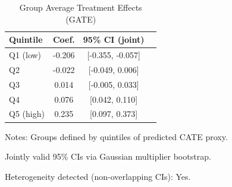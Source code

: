 \begin{table}[h]
\centering
\caption{Group Average Treatment Effects (GATE)}
\begin{tabular}{lccc}
\toprule
Quintile & Coef. & 95\% CI (joint) \\
\midrule
Q1 (low) & -0.206 & [-0.355, -0.057] \\
Q2 & -0.022 & [-0.049, 0.006] \\
Q3 & 0.014 & [-0.005, 0.033] \\
Q4 & 0.076 & [0.042, 0.110] \\
Q5 (high) & 0.235 & [0.097, 0.373] \\
\bottomrule
\end{tabular}
\begin{tablenotes}
\small
\item Notes: Groups defined by quintiles of predicted CATE proxy.
\item Jointly valid 95\% CIs via Gaussian multiplier bootstrap.
\item Heterogeneity detected (non-overlapping CIs): Yes.
\end{tablenotes}
\end{table}